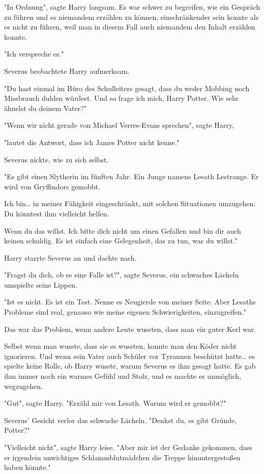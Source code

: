{"In Ordnung", sagte Harry langsam. Es war schwer zu begreifen, wie ein Gespräch zu führen und es niemandem erzählen zu können, einschränkender sein konnte als es nicht zu führen, weil man in diesem Fall auch niemandem den Inhalt erzählen konnte.

"Ich verspreche es."

Severus beobachtete Harry aufmerksam.

"Du hast einmal im Büro des Schulleiters gesagt, dass du weder Mobbing noch Missbrauch dulden würdest. Und so frage ich mich, Harry Potter. Wie sehr ähnelst du deinem Vater?"

"Wenn wir nicht gerade von Michael Verres-Evans sprechen", sagte Harry,

"lautet die Antwort, dass ich James Potter nicht kenne."

Severus nickte, wie zu sich selbst.

"Es gibt einen Slytherin im fünften Jahr. Ein Junge namens Lesath Lestrange. Er wird von Gryffindors gemobbt.

Ich bin… in meiner Fähigkeit eingeschränkt, mit solchen Situationen umzugehen. Du könntest ihm vielleicht helfen.

Wenn du das willst. Ich bitte dich nicht um einen Gefallen und bin dir auch keinen schuldig. Es ist einfach eine Gelegenheit, das zu tun, was du willst."

Harry starrte Severus an und dachte nach.

"Fragst du dich, ob es eine Falle ist?", sagte Severus, ein schwaches Lächeln umspielte seine Lippen.

"Ist es nicht. Es ist ein Test. Nenne es Neugierde von meiner Seite. Aber Lesaths Probleme sind real, genauso wie meine eigenen Schwierigkeiten, einzugreifen."

Das war das Problem, wenn andere Leute wussten, dass man ein guter Kerl war.

Selbst wenn man wusste, dass sie es wussten, konnte man den Köder nicht ignorieren. Und wenn sein Vater auch Schüler vor Tyrannen beschützt hatte… es spielte keine Rolle, ob Harry wusste, warum Severus es ihm gesagt hatte. Es gab ihm immer noch ein warmes Gefühl und Stolz, und es machte es unmöglich, wegzugehen.

"Gut", sagte Harry. "Erzähl mir von Lesath. Warum wird er gemobbt?"

Severus' Gesicht verlor das schwache Lächeln. "Denkst du, es gibt Gründe, Potter?"

"Vielleicht nicht", sagte Harry leise. "Aber mir ist der Gedanke gekommen, dass er irgendein unwichtiges Schlammblutmädchen die Treppe hinuntergestoßen haben könnte."

}
